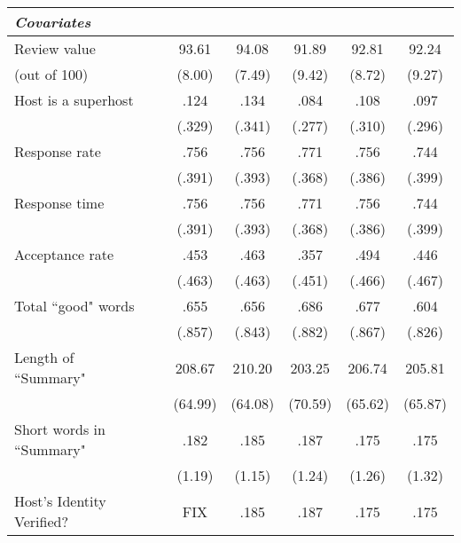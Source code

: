 {\begin{longtable}{l*{6}{c}}
		\textit{Covariates} \\
		\hline
		Review value      &   &      93.61	&      94.08	 	&      91.89		&    92.81	 & 		92.24\\
		(out of 100)              &      &     (8.00)         &     (7.49)         &     (9.42)         &     (8.72) 	&	 (9.27)         \\
		[1em]
		Host is a superhost    &    &      .124		&      .134&      .084 &      .108  	& 	.097\\
		& & (.329)     &     (.341)         &     (.277)         &     (.310)         &     (.296)         \\
		[1em]
		Response rate      &   &       .756		&       .756		&      .771         &      .756  	& 	.744\\
		& &     (.391)         &     (.393)         &     (.368)         &     (.386)         &		(.399)\\
		[1em]
		Response time      &   &       .756		&       .756		&      .771         &      .756  	& 	.744\\
		& &     (.391)         &     (.393)         &     (.368)         &     (.386)         &		(.399)\\
		[1em]
		Acceptance rate      &     &      .453&      .463&       .357         &      .494    &	.446     \\
		& &     (.463)         &     (.463)         &     (.451)         &     (.466)         &		(.467)\\
		[1em]
		Total ``good" words       &    &      .655&      .656&       .686         &      .677    &	.604     \\
		& &     (.857)         &     (.843)         &     (.882)         &     (.867)         &		(.826)\\
		[1em]
		Length of ``Summary"      &     &      208.67 	&      210.20	&       203.25         &      206.74    &	205.81     \\
		& &       (64.99)  &    (64.08)         &     (70.59)         &     (65.62)         &     (65.87) \\
		[1em]
		Short words in ``Summary"          &  &      .182		&      .185		&       .187         &      .175    &	.175     \\
		& &     (1.19)         &     (1.15)         &     (1.24)         &     (1.26)         &		(1.32)\\                    
		[1em]
		Host's Identity Verified?          &  &      FIX		&      .185		&       .187         &      .175    &	.175     \\

\end{longtable}}
